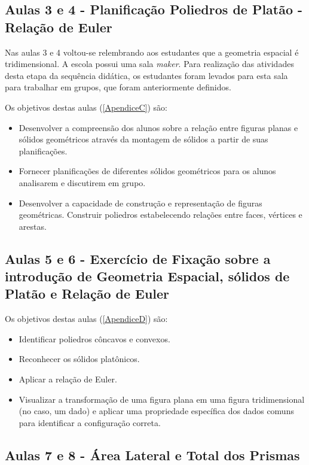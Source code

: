\subsection{Aulas 3 e 4 - Planificação Poliedros de Platão - Relação de Euler}

Nas aulas 3 e 4 voltou-se relembrando aos estudantes que a geometria espacial é tridimensional.  A escola possui uma sala \textit{maker}. Para realização das atividades desta etapa da sequência didática, os estudantes foram levados para esta sala para trabalhar em grupos, que foram anteriormente definidos.

Os objetivos destas aulas (\autoref{ApendiceC}) são:

\begin{itemize}
    \item Desenvolver a compreensão dos alunos sobre a relação entre figuras planas e sólidos geométricos através da montagem de sólidos a partir de suas planificações.
    \item Fornecer planificações de diferentes sólidos geométricos para os alunos analisarem e discutirem em grupo.
    \item Desenvolver a capacidade de construção e representação de figuras geométricas. Construir poliedros estabelecendo relações entre faces, vértices e arestas.
\end{itemize}

\subsection{Aulas 5 e 6 - Exercício de Fixação sobre a introdução de Geometria Espacial, sólidos de Platão e Relação de Euler}

Os objetivos destas aulas (\autoref{ApendiceD}) são:

\begin{itemize}
    \item Identificar poliedros côncavos e convexos.
    \item Reconhecer os sólidos platônicos.
    \item Aplicar a relação de Euler.
    \item Visualizar a transformação de uma figura plana em uma figura tridimensional (no caso, um dado) e aplicar uma propriedade específica dos dados comuns para identificar a configuração correta.
\end{itemize}

\subsection{Aulas 7 e 8 - Área Lateral e Total dos Prismas}

